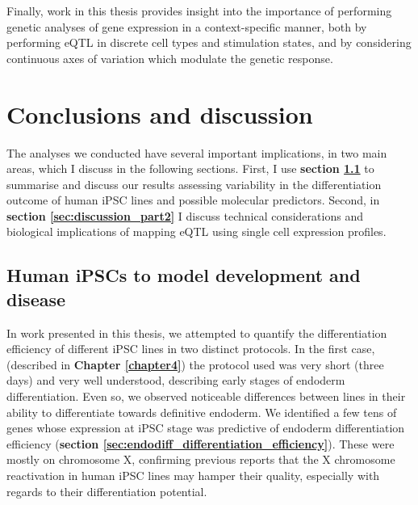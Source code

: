 Finally, work in this thesis provides insight into the importance of performing genetic analyses of gene expression in a context-specific manner, both by performing eQTL in discrete cell types and stimulation states, and by considering continuous axes of variation which modulate the genetic response.

\section{Conclusions and discussion}

The analyses we conducted have several important implications, in two main areas, which I discuss in the following sections.
First, I use \textbf{section \ref{sec:discussion_part1}} to summarise and discuss our results assessing variability in the differentiation outcome of human iPSC lines and possible molecular predictors.
Second, in \textbf{section \ref{sec:discussion_part2}} I discuss technical considerations and biological implications of mapping eQTL using single cell expression profiles.

\subsection{Human iPSCs to model development and disease}
\label{sec:discussion_part1}

In work presented in this thesis, we attempted to quantify the differentiation efficiency of different iPSC lines in two distinct protocols.
In the first case, (described in \textbf{Chapter 
\ref{chapter4}}) the protocol used was very short (three days) and very well understood, describing early stages of endoderm differentiation.
Even so, we observed noticeable differences between lines in their ability to differentiate towards definitive endoderm.
We identified a few tens of genes whose expression at iPSC stage was predictive of endoderm differentiation efficiency (\textbf{section \ref{sec:endodiff_differentiation_efficiency}}).
These were mostly on chromosome X, confirming previous reports that the X chromosome reactivation in human iPSC lines may hamper their quality, especially with regards to their differentiation potential.\\

